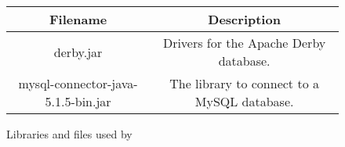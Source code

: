 \begin{figure}[H]\begin{center}\begin{tabular}{|c|c|}\hline Filename & Description\\\hline\hline derby.jar & Drivers for the Apache Derby database.\\mysql-connector-java-5.1.5-bin.jar & The library to connect to a MySQL database.\\\hline\end{tabular}\label{tabular:libraries}\caption{Libraries and files used by \Kieker{}}\end{center}\end{figure}